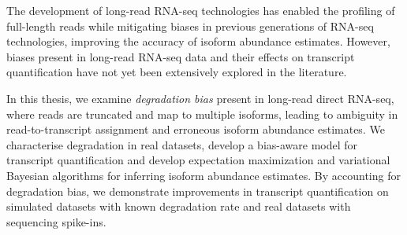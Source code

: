 
The development of long-read RNA-seq technologies has enabled the profiling of full-length reads while mitigating biases in previous generations of RNA-seq technologies, improving the accuracy of isoform abundance estimates. However, biases present in long-read RNA-seq data and their effects on transcript quantification have not yet been extensively explored in the literature. 

In this thesis, we examine \textit{degradation bias} present in long-read direct RNA-seq, where reads are truncated and map to multiple isoforms, leading to ambiguity in read-to-transcript assignment and erroneous isoform abundance estimates. We characterise degradation in real datasets, develop a bias-aware model for transcript quantification and develop expectation maximization and variational Bayesian algorithms for inferring isoform abundance estimates. By accounting for degradation bias, we demonstrate improvements in transcript quantification on simulated datasets with known degradation rate and real datasets with sequencing spike-ins.

